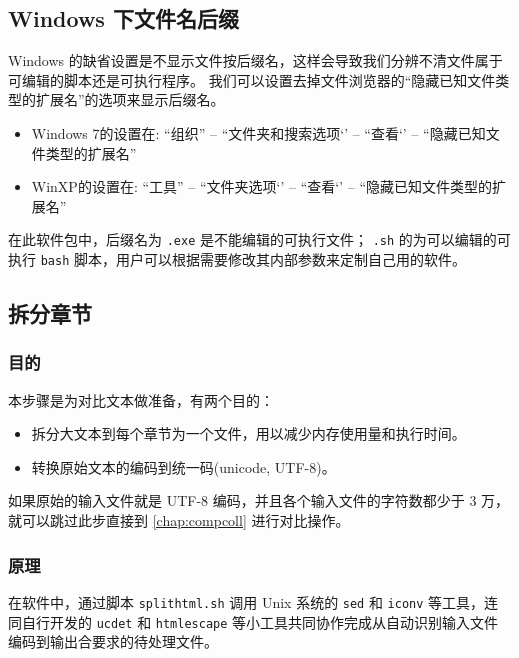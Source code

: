 \documentclass{article}
\begin{document}
\subsection{Windows 下文件名后缀}
Windows 的缺省设置是不显示文件按后缀名，这样会导致我们分辨不清文件属于可编辑的脚本还是可执行程序。
我们可以设置去掉文件浏览器的``隐藏已知文件类型的扩展名''的选项来显示后缀名。

\begin{itemize}
  \item Windows 7的设置在: ``组织'' -- ``文件夹和搜索选项‘’ -- ``查看‘’ -- ``隐藏已知文件类型的扩展名''
  \item WinXP的设置在: ``工具'' -- ``文件夹选项‘’ -- ``查看‘’ -- ``隐藏已知文件类型的扩展名''
\end{itemize}

在此软件包中，后缀名为 \texttt{.exe} 是不能编辑的可执行文件； \texttt{.sh} 的为可以编辑的可执行 \texttt{bash} 脚本，用户可以根据需要修改其内部参数来定制自己用的软件。

\subsection{拆分章节} \label{chap:splitdata}

\subsubsection{目的}
本步骤是为对比文本做准备，有两个目的：
\begin{itemize}
  \item 拆分大文本到每个章节为一个文件，用以减少内存使用量和执行时间。
  \item 转换原始文本的编码到统一码(unicode, UTF-8)。
\end{itemize}

如果原始的输入文件就是 UTF-8 编码，并且各个输入文件的字符数都少于 3 万，就可以跳过此步直接到 \ref{chap:compcoll} 进行对比操作。


\subsubsection{原理}

在软件中，通过脚本 \texttt{splithtml.sh} 调用 Unix 系统的 \texttt{sed} 和 \texttt{iconv} 等工具，连同自行开发的 \texttt{ucdet} 和 \texttt{htmlescape} 等小工具共同协作完成从自动识别输入文件编码到输出合要求的待处理文件。
\end{document}
